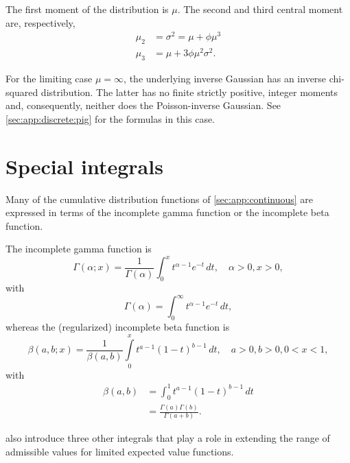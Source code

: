 \documentclass[x11names]{article}
\begin{document}
The first moment of the distribution is $\mu$. The second and third
central moment are, respectively,
\begin{align*}
  \mu_2 &= \sigma^2 = \mu + \phi\mu^3 \\
  \mu_3 &= \mu + 3 \phi \mu^2 \sigma^2.
\end{align*}

For the limiting case $\mu = \infty$, the underlying inverse Gaussian
has an inverse chi-squared distribution. The latter has no finite
strictly positive, integer moments and, consequently, neither does the
Poisson-inverse Gaussian. See \autoref{sec:app:discrete:pig} for the
formulas in this case.


\section{Special integrals}
\label{sec:special-integrals}

Many of the cumulative distribution functions of
\autoref{sec:app:continuous} are expressed in terms of the incomplete
gamma function or the incomplete beta function.

The incomplete gamma function is
\begin{equation}
  \label{eq:pgamma}
  \Gamma(\alpha; x) = \frac{1}{\Gamma(\alpha)}
  \int_0^x t^{\alpha - 1} e^{-t}\, dt, \quad \alpha > 0, x > 0,
\end{equation}
with
\begin{equation*}
  \Gamma(\alpha) = \int_0^\infty t^{\alpha - 1} e^{-t}\, dt,
\end{equation*}
whereas the (regularized) incomplete beta function is
\begin{equation}
  \label{eq:pbeta}
  \beta(a, b; x) = \frac{1}{\beta(a, b)}
  \int\limits_0^x t^{a - 1} (1 - t)^{b - 1}\, dt, \quad a > 0, b > 0, 0 < x < 1,
\end{equation}
with
\begin{align*}
  \beta(a, b)
  &= \int_0^1 t^{a - 1} (1 - t)^{b - 1}\, dt \\
  &= \frac{\Gamma(a) \Gamma(b)}{\Gamma(a + b)}.
\end{align*}

\citet{LossModels4e} also introduce three other integrals that play a
role in extending the range of admissible values for limited expected
value functions.
\end{document}
